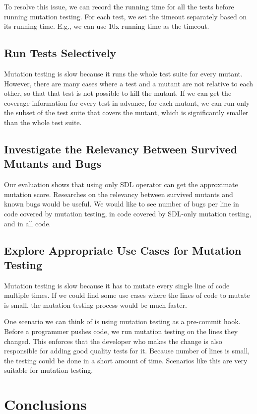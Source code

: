 \documentclass[12pt]{article}
\begin{document}
To resolve this issue, we can record the running time for all the tests before running mutation testing. For each test, we set the timeout separately based on its running time. E.g., we can use 10x running time as the timeout.

\subsection{Run Tests Selectively}

Mutation testing is slow because it runs the whole test suite for every mutant. However, there are many cases where a test and a mutant are not relative to each other, so that that test is not possible to kill the mutant. If we can get the coverage information for every test in advance, for each mutant, we can run only the subset of the test suite that covers the mutant, which is significantly smaller than the whole test suite.

\subsection{Investigate the Relevancy Between Survived Mutants and Bugs}

Our evaluation shows that using only SDL operator can get the approximate mutation score. Researches on the relevancy between survived mutants and known bugs would be useful. We would like to see number of bugs per line in code covered by mutation testing, in code covered by SDL-only mutation testing, and in all code.

\subsection{Explore Appropriate Use Cases for Mutation Testing}

Mutation testing is slow because it has to mutate every single line of code multiple times. If we could find some use cases where the lines of code to mutate is small, the mutation testing process would be much faster.

One scenario we can think of is using mutation testing as a pre-commit hook. Before a programmer pushes code, we run mutation testing on the lines they changed. This enforces that the developer who makes the change is also responsible for adding good quality tests for it. Because number of lines is small, the testing could be done in a short amount of time. Scenarios like this are very suitable for mutation testing.

\section{Conclusions}



\end{document}
